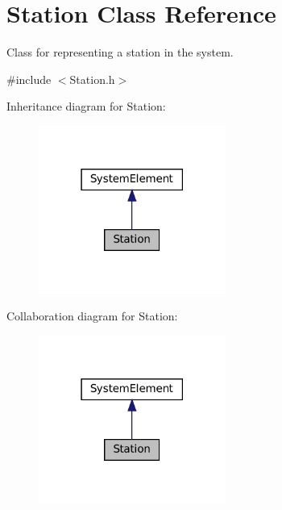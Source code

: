 \hypertarget{classStation}{}\section{Station Class Reference}
\label{classStation}


Class for representing a station in the system.  




{\ttfamily \#include $<$Station.\+h$>$}



Inheritance diagram for Station\+:
\nopagebreak
\begin{figure}[H]
\begin{center}
\leavevmode
\includegraphics[width=174pt]{classStation__inherit__graph}
\end{center}
\end{figure}


Collaboration diagram for Station\+:
\nopagebreak
\begin{figure}[H]
\begin{center}
\leavevmode
\includegraphics[width=174pt]{classStation__coll__graph}
\end{center}
\end{figure}
